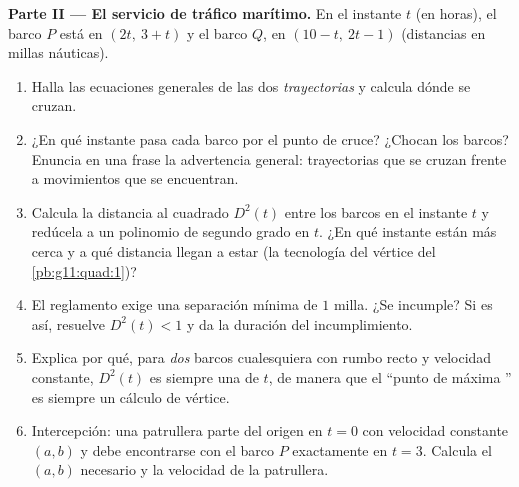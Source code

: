\begin{problem}
\medskip
\noindent\textbf{Parte II --- El servicio de tráfico marítimo.}
En el instante $t$ (en horas), el barco $P$ está en $(2t,\ 3 + t)$ y el
barco $Q$, en $(10 - t,\ 2t - 1)$ (distancias en millas náuticas).
\begin{enumerate}[resume]
  \item Halla las ecuaciones generales de las dos \emph{trayectorias} y
        calcula dónde se cruzan.
  \item ¿En qué instante pasa cada barco por el punto de cruce? ¿Chocan
        los barcos? Enuncia en una frase la advertencia general:
        trayectorias que se cruzan frente a movimientos que se encuentran.
  \item Calcula la distancia al cuadrado $D^2(t)$ entre los barcos en el
        instante $t$ y redúcela a un polinomio de segundo grado en $t$.
        ¿En qué instante están más cerca y a qué distancia llegan a estar
        (la tecnología del vértice del \cref{pb:g11:quad:1})?
  \item El reglamento exige una separación mínima de $1$ milla. ¿Se
        incumple? Si es así, resuelve $D^2(t) < 1$ y da la duración del
        incumplimiento.
  \item Explica por qué, para \emph{dos} barcos cualesquiera con rumbo
        recto y velocidad constante, $D^2(t)$ es siempre una  de $t$, de manera que el ``punto de máxima
        '' es siempre un cálculo de vértice.
  \item Intercepción: una patrullera parte del origen en $t = 0$ con
        velocidad constante $(a, b)$ y debe encontrarse con el barco $P$
        exactamente en $t = 3$. Calcula el $(a, b)$ necesario y la
        velocidad de la patrullera.
\end{enumerate}


\end{problem}
